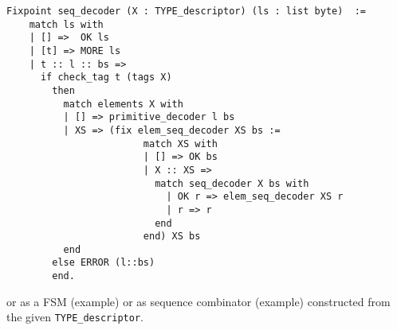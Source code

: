 \documentclass[acmsmall,nonacm]{acmart}
\begin{document}
 \begin{lstlisting}[language=Coq]
 Fixpoint seq_decoder (X : TYPE_descriptor) (ls : list byte)  :=
    match ls with
    | [] =>  OK ls
    | [t] => MORE ls       
    | t :: l :: bs =>          
      if check_tag t (tags X)
        then
          match elements X with 
          | [] => primitive_decoder l bs 
          | XS => (fix elem_seq_decoder XS bs :=
                        match XS with
                        | [] => OK bs
                        | X :: XS =>
                          match seq_decoder X bs with
                            | OK r => elem_seq_decoder XS r 
                            | r => r
                          end
                        end) XS bs
          end
        else ERROR (l::bs)
        end.
 \end{lstlisting}

 or as a FSM (example) or as sequence combinator (example) constructed from the given \texttt{TYPE\_descriptor}. 


  
\end{document}
